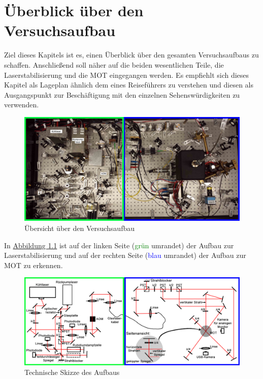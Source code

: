 \documentclass[
class=book,
accentcolor=1b,
custommargins=geometry,
fontsize=11pt,
thesis={type=Versuchsanleitung},
ruledheaders=all,
headline=false,
instbox=false,
marginpar=false,
title=small,
ignore-missing-data=true,
twoside=false,
logofile=apqdesign/tuda_logo.pdf,
pdfa=false %
]{apqpub}
\newcommand{\gqq}[1]{\glqq{}#1\grqq{}}
\begin{document}
\chapter{Überblick über den Versuchsaufbau}
\label{chap:ueberblick}
Ziel dieses Kapitels ist es, einen Überblick über den gesamten Versuchsaufbaus zu schaffen. 
Anschließend soll näher auf die beiden wesentlichen Teile, die Laserstabilisierung und die MOT eingegangen werden. 
Es empfiehlt sich dieses Kapitel als Lageplan ähnlich dem eines Reiseführers zu verstehen und diesen als Ausgangspunkt zur Beschäftigung mit den einzelnen \gqq{Sehenswürdigkeiten} zu verwenden.
\begin{figure}[htb!]
	\centering
	\includegraphics[width=\textwidth]{graphics/GUE3.jpg}
	\caption{Übersicht über den Versuchsaufbau}
	\label{fig:GUE}
\end{figure}

In \hyperref[fig:GUE]{Abbildung \ref{fig:GUE}} ist auf der linken Seite (\textcolor{green}{grün} umrandet) der Aufbau zur Laserstabilisierung und auf der rechten Seite (\textcolor{blue}{blau} umrandet) der Aufbau zur MOT zu erkennen.
\begin{figure}[htb!]
	\centering
	\includegraphics[width=\textwidth]{graphics/TZ2.jpg}
	\caption{Technische Skizze des Aufbaus}
	\label{fig:TZ}
\end{figure} 
\end{document}

